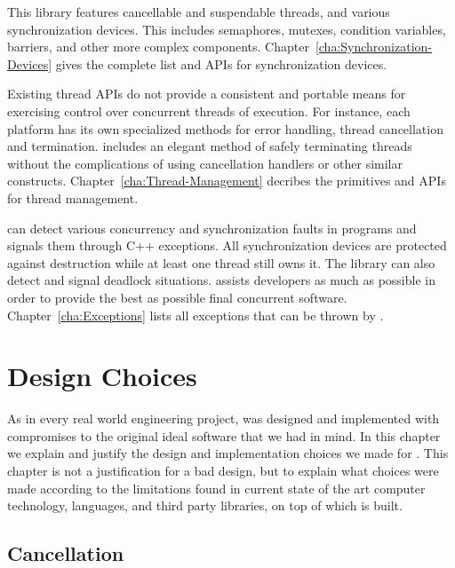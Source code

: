 This library features cancellable and suspendable threads, and various
synchronization devices. This includes semaphores, mutexes, condition
variables, barriers, and other more complex components.
Chapter~\ref{cha:Synchronization-Devices} gives the complete list and
APIs for \lisle synchronization devices.

Existing thread APIs do not provide a consistent and portable means
for exercising control over concurrent threads of execution. For
instance, each platform has its own specialized methods for error
handling, thread cancellation and termination. \lisle includes an
elegant method of safely terminating threads without the complications
of using cancellation handlers or other similar
constructs. Chapter~\ref{cha:Thread-Management} decribes the
primitives and APIs for \lisle thread management.

\lisle can detect various concurrency and synchronization faults in
programs and signals them through C++ exceptions. All synchronization
devices are protected against destruction while at least one thread
still owns it. The library can also detect and signal deadlock
situations. \lisle assists developers as much as possible in order
to provide the best as possible final concurrent
software. Chapter~\ref{cha:Exceptions} lists all exceptions that can
be thrown by \lisle.

\chapter{Design Choices}
\label{cha:Design-Choices}

\manminitoc
\noindent
As in every real world engineering project, \lisle{} was designed and
implemented with compromises to the original ideal software that we
had in mind. In this chapter we explain and justify the design and
implementation choices we made for \lisle{}. This chapter is not a
justification for a bad design, but to explain what choices were made
according to the limitations found in current state of the art
computer technology, languages, and third party libraries, on top of
which \lisle{} is built.

\section{Cancellation}
\label{sec:Design-Cancellation}

